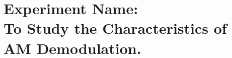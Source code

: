 \documentclass[12pt]{report}
\begin{document}


\tableofcontents
\newpage
\section*{Experiment Name: \\ To Study the Characteristics of AM Demodulation.}














\end{document}
